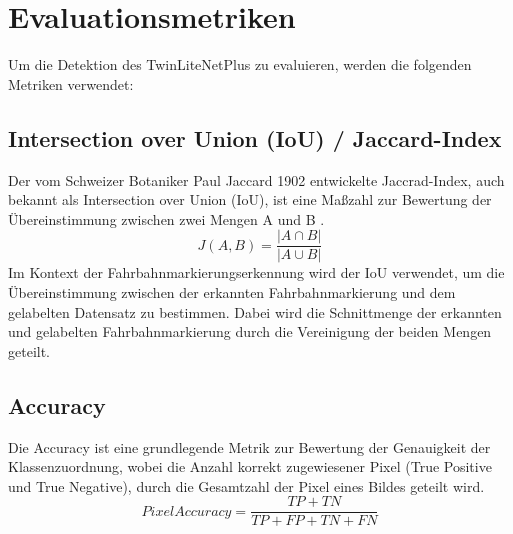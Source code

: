 
\section{Evaluationsmetriken} %
    Um die Detektion des TwinLiteNetPlus zu evaluieren, werden die folgenden Metriken verwendet:
    
    \subsection{Intersection over Union (IoU) / Jaccard-Index}
        Der vom Schweizer Botaniker Paul Jaccard 1902 entwickelte Jaccrad-Index, auch bekannt als Intersection over Union (IoU), ist eine Ma{\ss}zahl zur Bewertung der Übereinstimmung zwischen zwei Mengen A und B \cite{jaccard1902}.
        \[
        J(A, B) = \frac{|A \cap B|}{|A \cup B|}
        \]
        Im Kontext der Fahrbahnmarkierungserkennung wird der IoU verwendet, um die Übereinstimmung zwischen der erkannten Fahrbahnmarkierung und dem gelabelten Datensatz zu bestimmen. 
        Dabei wird die Schnittmenge der erkannten und gelabelten Fahrbahnmarkierung durch die Vereinigung der beiden Mengen geteilt.

    \subsection{Accuracy}
    Die Accuracy ist eine grundlegende Metrik zur Bewertung der Genauigkeit der Klassenzuordnung, wobei die Anzahl korrekt zugewiesener Pixel (True Positive und True Negative), durch die Gesamtzahl der Pixel eines Bildes geteilt wird.
    \[
    Pixel Accuracy = \frac{TP+TN}{TP+FP+TN+FN}
    \]
    
